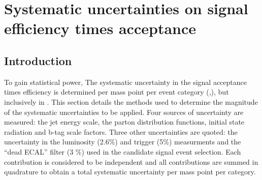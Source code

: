 %

\clearpage
\section{Systematic uncertainties on signal efficiency times 
  acceptance\label{sec:sms-syst}}

\subsection{Introduction} 

To gain statistical power, The systematic uncertainty in the signal 
acceptance times efficiency is determined per mass point per event 
category (\njet,\nb), but inclusively in \scalht . This section details the methods 
used to determine the magnitude of the systematic uncertainties to be applied. 
Four sources of uncertainty are measured: the jet energy scale,
the parton distribution functions, initial state radiation and b-tag scale
factors. Three other uncertainties are quoted: the uncertainty in the luminosity (2.6\%) and
trigger (5\%) measurments and the ``dead ECAL'' filter (3 \%) used in the candidate signal
event selection. Each contribution is considered to be independent 
and all contributions are summed in quadrature to obtain a total 
systematic uncertainty per mass point per category.

